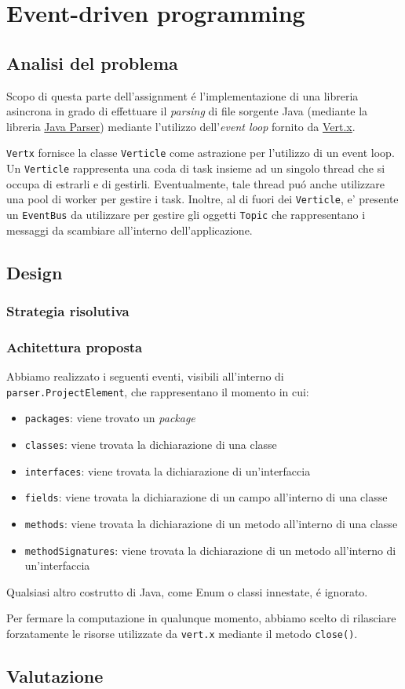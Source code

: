 \documentclass[report]{subfiles}
\begin{document}
	\section{Event-driven programming}
	\subsection{Analisi del problema}
	Scopo di questa parte dell'assignment \'e l'implementazione di una libreria asincrona in grado di effettuare il \emph{parsing} di file sorgente Java (mediante la libreria \href{https://javaparser.org/}{Java Parser}) mediante l'utilizzo dell'\emph{event loop} fornito da \href{https://vertx.io/}{Vert.x}.
	
	\texttt{Vertx} fornisce la classe \texttt{Verticle} come astrazione per l'utilizzo di un event loop. Un \texttt{Verticle} rappresenta una coda di task insieme ad un singolo thread che si occupa di estrarli e di gestirli. Eventualmente, tale thread pu\'o anche utilizzare una pool di worker per gestire i task. Inoltre, al di fuori dei \texttt{Verticle}, e' presente un \texttt{EventBus} da utilizzare per gestire gli oggetti \texttt{Topic} che rappresentano i messaggi da scambiare all'interno dell'applicazione.
	
	\subsection{Design}
	\subsubsection{Strategia risolutiva}
	\subsubsection{Achitettura proposta}
	Abbiamo realizzato i seguenti eventi, visibili all'interno di \texttt{parser.ProjectElement}, che rappresentano il momento in cui:
	\begin{itemize}
		\item \texttt{packages}: viene trovato un \emph{package}
		\item \texttt{classes}: viene trovata la dichiarazione di una classe
		\item \texttt{interfaces}: viene trovata la dichiarazione di un'interfaccia
		\item \texttt{fields}: viene trovata la dichiarazione di un campo all'interno di una classe
		\item \texttt{methods}: viene trovata la dichiarazione di un metodo all'interno di una classe
		\item \texttt{methodSignatures}: viene trovata la dichiarazione di un metodo all'interno di un'interfaccia
	\end{itemize}
	
	Qualsiasi altro costrutto di Java, come Enum o classi innestate, \'e ignorato.
	
	Per fermare la computazione in qualunque momento, abbiamo scelto di rilasciare forzatamente le risorse utilizzate da \texttt{vert.x} mediante il metodo \texttt{close()}.
	
	\subsection{Valutazione}
\end{document}
